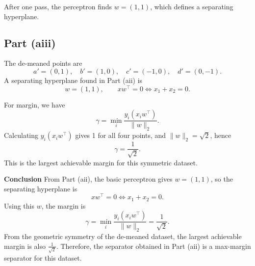 \documentclass[fleqn]{article}
\begin{document}
    After one pass, the perceptron finds $w=(1,1)$, which defines a separating hyperplane.

    \newpage
    \subsection{Part (aiii)}
    The de-meaned points are
    \[
        a'=(0,1),\quad b'=(1,0),\quad c'=(-1,0),\quad d'=(0,-1).
    \]
    A separating hyperplane found in Part (aii) is
    \[
        w=(1,1), \qquad x w^\top = 0 \iff x_1 + x_2 = 0.
    \]

    \begin{center}
    \end{center}

    \noindent For margin, we have
    \[
        \gamma = \min_i \frac{y_i (x_i w^\top)}{\|w\|_2}.
    \]
    Calculating $y_i(x_i w^\top)$ gives 1 for all four points, and $\|w\|_2=\sqrt{2}$, hence
    \[
        \gamma = \frac{1}{\sqrt{2}}.
    \]
    This is the largest achievable margin for this symmetric dataset.

    \medskip
    \noindent\textbf{Conclusion}
    From Part (aii), the basic perceptron gives $w=(1,1)$, so the separating hyperplane is
    \[
        x w^\top = 0 \iff x_1+x_2=0.
    \]
    Using this $w$, the margin is
    \[
        \gamma=\min_i \frac{y_i(x_i w^\top)}{\|w\|_2}=\frac{1}{\sqrt{2}}.
    \]
    From the geometric symmetry of the de-meaned dataset, the largest achievable margin is also $\frac{1}{\sqrt{2}}$.
    Therefore, the separator obtained in Part (aii) is a max-margin separator for this dataset.

    \newpage
\end{document}
